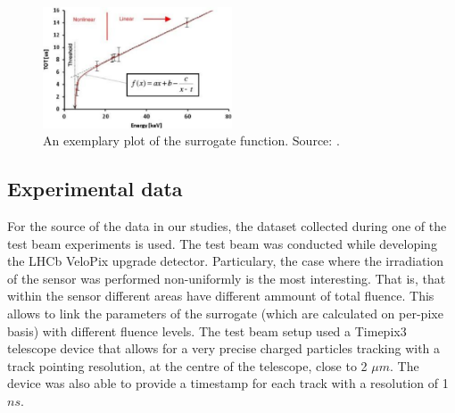 \begin{figure}[H]
\centering
\includegraphics[width=0.5\textwidth]{figures/chapter4/surrogates/Dependence-of-the-time-over-threshold-signal-measured-by-a-single-Timepix-pixel-on.png}
\caption{An exemplary plot of the surrogate function. Source: \cite{Platkevic:2013}.}
\label{fig:surrogate}
\end{figure}

\subsection{Experimental data}

For the source of the data in our studies, the dataset collected during one of the test beam \cite{Abba_2016} experiments is used. 
The test beam was conducted while developing the LHCb VeloPix upgrade detector.
Particulary, the case where the irradiation of the sensor was performed non-uniformly is the most interesting. That is, that within the sensor different areas have different ammount of total fluence.
This allows to link the parameters of the surrogate (which are calculated on per-pixe basis) with different fluence levels.
The test beam  setup used a Timepix3 telescope device \cite{Akiba_2013} that allows for a very precise charged particles tracking with a track pointing resolution, at the centre of the telescope, close to 2 $\mu m$. The device was also able to provide a timestamp for each track with a resolution of 1 $ns$.

